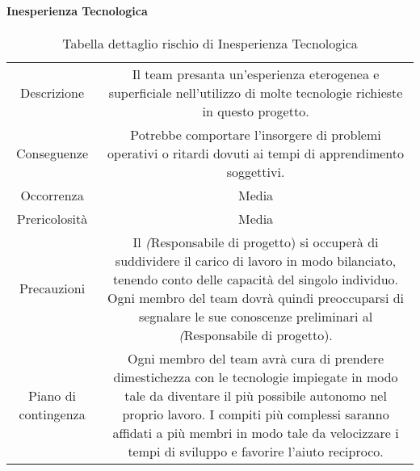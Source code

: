 \paragraph{Inesperienza Tecnologica}
\renewcommand{\arraystretch}{1}
	\begin{table}[H]
		\begin{center}
			\setlength{\aboverulesep}{0pt}
			\setlength{\belowrulesep}{0pt}
			\setlength{\extrarowheight}{.75ex}
			\begin{tabular}{ c c }
				\rowcolor{AzzurroGruppo!30} 
                \toprule
                Descrizione & Il team presanta un'esperienza eterogenea e superficiale nell'utilizzo di molte tecnologie richieste in questo progetto. \\
				Conseguenze & Potrebbe comportare l'insorgere di problemi operativi o ritardi dovuti ai tempi di apprendimento soggettivi. \\
                Occorrenza & Media \\
                Prericolosità & Media \\
                Precauzioni & Il \textit(Responsabile di progetto) si occuperà di suddividere il carico di lavoro in modo bilanciato, tenendo conto delle capacità del singolo individuo. Ogni membro del team dovrà quindi preoccuparsi di segnalare le sue conoscenze preliminari al \textit(Responsabile di progetto). \\
                Piano di contingenza & Ogni membro del team avrà cura di prendere dimestichezza con le tecnologie impiegate in modo tale da diventare il più possibile autonomo nel proprio lavoro. I compiti più complessi saranno affidati a più membri in modo tale da velocizzare i tempi di sviluppo e favorire l'aiuto reciproco. \\
				\bottomrule
			\end{tabular}
			\caption{Tabella dettaglio rischio di Inesperienza Tecnologica}
		\end{center}
    \end{table}

